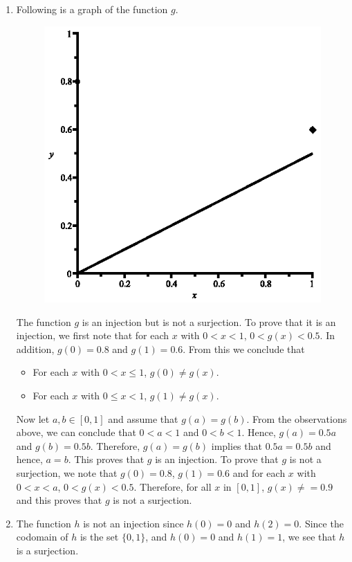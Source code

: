 \documentclass[11pt]{article}
\begin{document}
\begin{enumerate}
\newpage
\item Following is a graph of the function $g$.
\begin{figure}[h]
\begin{center}
\includegraphics{fig-sec63-exer18b.eps}
\end{center}
\end{figure}
\newpar
The function $g$ is an injection but is not a surjection.  To prove that it is an injection, we first note that for each $x$ with $0 < x < 1$, $0 < g(x) < 0.5$.  In addition, $g(0) = 0.8$ and $g(1) = 0.6$.  From this we conclude that
\begin{itemize}
  \item For each $x$ with $0 < x \leq 1$, $g(0) \ne g(x)$.
  \item For each $x$ with $0 \leq x < 1$, $g(1) \ne g(x)$.
\end{itemize}
Now let $a, b \in [0, 1]$ and assume that $g(a) = g(b)$.  From the observations above, we can conclude that $0 < a < 1$ and $0 < b < 1$.  Hence, $g(a) = 0.5a$ and $g(b) = 0.5b$. Therefore, $g(a) = g(b)$ implies that $0.5a = 0.5b$ and hence, $a = b$.  This proves that $g$ is an injection.  To prove that $g$ is not a surjection, we note that $g(0) = 0.8$, $g(1) = 0.6$ and for each $x$ with $0 < x < a$, $0 < g(x) < 0.5$.  Therefore, for all $x$ in $[0, 1]$, $g(x) \ne =0.9$ and this proves that $g$ is not a surjection.


\item The function $h$ is not an injection since $h(0) = 0$ and $h(2) = 0$.  Since the codomain of $h$ is the set $\{0, 1\}$, and $h(0) = 0$ and $h(1) = 1$, we see that $h$ is a surjection.
\end{enumerate}
\end{document}
